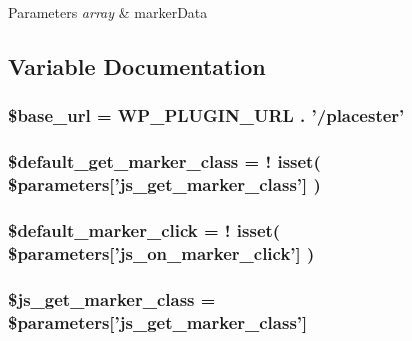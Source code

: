 \begin{DoxyParams}{Parameters}
{\em array} & markerData \\
\hline
\end{DoxyParams}


\subsection{Variable Documentation}
\hypertarget{listings__map_8php_a6886427c9c643f707fcb35c018049bc7}{
\subsubsection[{\$base\_\-url}]{\setlength{\rightskip}{0pt plus 5cm}\$base\_\-url = WP\_\-PLUGIN\_\-URL . '/placester'}}
\label{dc/d04/listings__map_8php_a6886427c9c643f707fcb35c018049bc7}
\hypertarget{listings__map_8php_a6a64d265b170f571e9a7b8dd6c125991}{
\subsubsection[{\$default\_\-get\_\-marker\_\-class}]{\setlength{\rightskip}{0pt plus 5cm}\$default\_\-get\_\-marker\_\-class = ! isset( \$parameters\mbox{[}'js\_\-get\_\-marker\_\-class'\mbox{]} )}}
\label{dc/d04/listings__map_8php_a6a64d265b170f571e9a7b8dd6c125991}
\hypertarget{listings__map_8php_a1358e3da1e02e91db10e61ba8e17832c}{
\subsubsection[{\$default\_\-marker\_\-click}]{\setlength{\rightskip}{0pt plus 5cm}\$default\_\-marker\_\-click = ! isset( \$parameters\mbox{[}'js\_\-on\_\-marker\_\-click'\mbox{]} )}}
\label{dc/d04/listings__map_8php_a1358e3da1e02e91db10e61ba8e17832c}
\hypertarget{listings__map_8php_a9b99c2d59610fff900adbf713b636026}{
\subsubsection[{\$js\_\-get\_\-marker\_\-class}]{ \$js\_\-get\_\-marker\_\-class = \$parameters\mbox{[}'js\_\-get\_\-marker\_\-class'\mbox{]}}}

